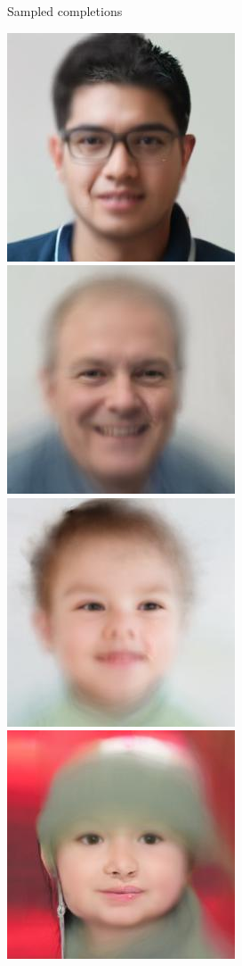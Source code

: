 \begin{figure}[t]
\begin{subfigure}[t]{0.73\textwidth}
    \caption{Sampled completions}
  \end{subfigure}
  \begin{subfigure}[t]{0.1\textwidth}
    \centering
    \includegraphics[height=\cmgfailureimgheight]{figs/cigcvae/co_mod_gan_failure/avg_co_mod_gan_0_3_2.jpg}
    \includegraphics[height=\cmgfailureimgheight]{figs/cigcvae/co_mod_gan_failure/avg_co_mod_gan_0_4_2.jpg}
    \includegraphics[height=\cmgfailureimgheight]{figs/cigcvae/co_mod_gan_failure/avg_co_mod_gan_1_4_2.jpg}
    \includegraphics[height=\cmgfailureimgheight]{figs/cigcvae/co_mod_gan_failure/avg_co_mod_gan_56_4_12.jpg}

\end{subfigure}
\end{figure}
